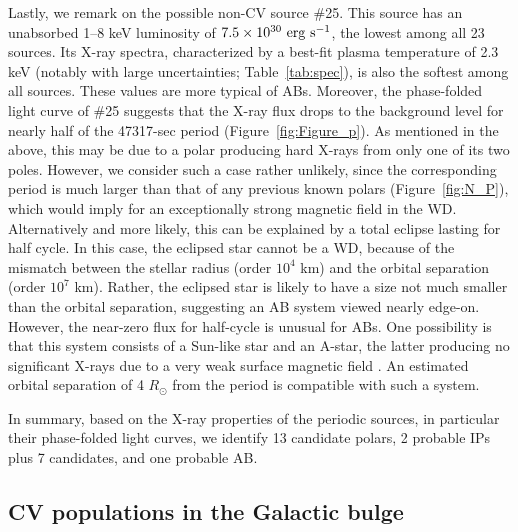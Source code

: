 \documentclass[fleqn,usenatbib]{mnras}
\begin{document}
Lastly, we remark on the possible non-CV source \#25. This source has an unabsorbed 1--8 keV luminosity of $\rm 7.5 \times 10^{30}~erg~s^{-1}$, the lowest among all 23 sources. Its X-ray spectra, characterized by a best-fit plasma temperature of 2.3 keV (notably with large uncertainties; Table~\ref{tab:spec}), is also the softest among all sources.
These values are more typical of ABs. 
Moreover, the phase-folded light curve of \#25 suggests that the X-ray flux drops to the background level for nearly half of the 47317-sec period (Figure~\ref{fig:Figure_p}). 
As mentioned in the above, this may be due to a polar producing hard X-rays from only one of its two poles.
However, we consider such a case rather unlikely, since the corresponding period is much larger than that of any previous known polars (Figure~\ref{fig:N_P}), which would imply for an exceptionally strong magnetic field in the WD. 
Alternatively and more likely, this can be explained by a total eclipse lasting for half cycle.
In this case, the eclipsed star cannot be a WD, because of the mismatch between the stellar radius (order $10^4$ km)
and the orbital separation (order $10^7$ km).
Rather, the eclipsed star is likely to have a size not much smaller than the orbital separation, suggesting an AB system viewed nearly edge-on.
However, the near-zero flux for half-cycle is unusual for ABs. One possibility is that this system consists of a Sun-like star and an A-star, the latter producing no significant X-rays due to a very weak surface magnetic field \citep{2004A&ARv..12...71G}. 
An estimated orbital separation of 4 $R_\odot$ from the period is compatible with such a system. 

In summary, based on the X-ray properties of the periodic sources, in particular their phase-folded light curves, we identify 13 candidate polars, 2 probable IPs plus 7 candidates, and one probable AB. 

\subsection{CV populations in the Galactic bulge}\label{subsec:population}

 
\end{document}
